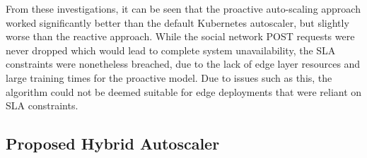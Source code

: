 From these investigations, it can be seen that the proactive auto-scaling approach worked significantly better than the default Kubernetes autoscaler, but slightly worse than the reactive approach. While the social network POST requests were never dropped which would lead to complete system unavailability, the SLA constraints were nonetheless breached, due to the lack of edge layer resources and large training times for the proactive model. Due to issues such as this, the algorithm could not be deemed suitable for edge deployments that were reliant on SLA constraints.\par

\subsection {Proposed Hybrid Autoscaler}
\label{subsec:ch5-hybrid-algo}

